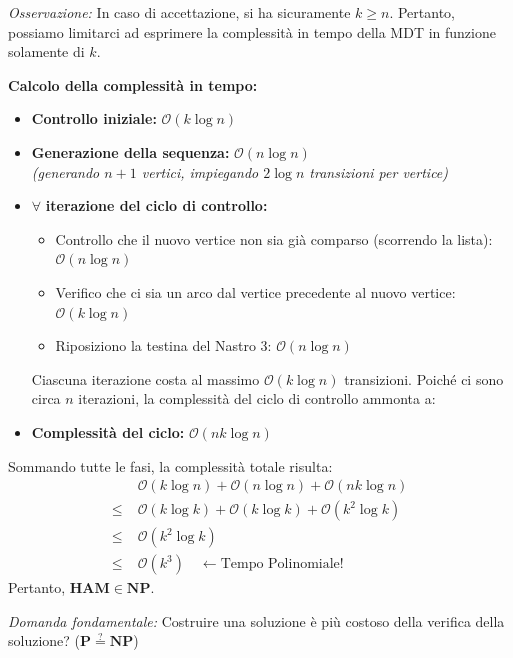 \textit{Osservazione:} In caso di accettazione, si ha sicuramente $k \ge n$. Pertanto, possiamo limitarci ad esprimere la complessità in tempo della MDT in funzione solamente di $k$.

\vspace{0.3cm}
\textbf{Calcolo della complessità in tempo:}
\begin{itemize}
    \item \textbf{Controllo iniziale:} $\mathcal{O}(k \log n)$
    \item \textbf{Generazione della sequenza:} $\mathcal{O}(n \log n)$ \\
    \textit{(generando $n+1$ vertici, impiegando $2 \log n$ transizioni per vertice)}
    
    \item $\forall$ \textbf{iterazione del ciclo di controllo:}
    \begin{itemize}
        \item Controllo che il nuovo vertice non sia già comparso (scorrendo la lista): $\mathcal{O}(n \log n)$
        \item Verifico che ci sia un arco dal vertice precedente al nuovo vertice: $\mathcal{O}(k \log n)$
        \item Riposiziono la testina del Nastro 3: $\mathcal{O}(n \log n)$
    \end{itemize}
    Ciascuna iterazione costa al massimo $\mathcal{O}(k \log n)$ transizioni. Poiché ci sono circa $n$ iterazioni, la complessità del ciclo di controllo ammonta a:
    \item \textbf{Complessità del ciclo:} $\mathcal{O}(n k \log n)$
\end{itemize}

\vspace{0.2cm}
Sommando tutte le fasi, la complessità totale risulta:
\begin{align*}
    &\mathcal{O}(k \log n) + \mathcal{O}(n \log n) + \mathcal{O}(n k \log n) \\
    \le \;&\mathcal{O}(k \log k) + \mathcal{O}(k \log k) + \mathcal{O}(k^2 \log k) \\
    \le \;&\mathcal{O}(k^2 \log k) \\
    \le \;&\mathcal{O}(k^3) \quad \longleftarrow \text{Tempo Polinomiale!}
\end{align*}
Pertanto, $\mathbf{HAM \in NP}$.

\vspace{0.2cm}
\textit{Domanda fondamentale:} Costruire una soluzione è più costoso della verifica della soluzione? ($\mathbf{P \overset{?}{=} NP}$)



